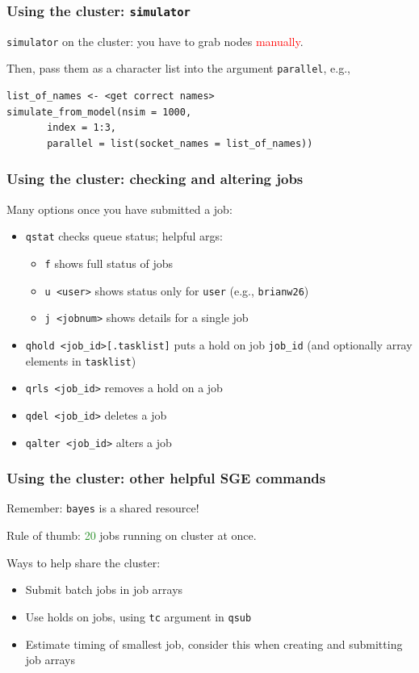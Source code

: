 \documentclass[12pt, 
hyperref={colorlinks=true, linkcolor=BlueViolet, urlcolor=BlueViolet},dvipsnames]{beamer}
\begin{document}
\begin{frame}[fragile]
\frametitle{Using the cluster: \texttt{simulator}}
\texttt{simulator} on the cluster: you have to grab nodes \textcolor{red}{manually}. \pause

Then, pass them as a character list into the argument \texttt{parallel}, e.g., \pause
\begin{verbatim}
list_of_names <- <get correct names>
simulate_from_model(nsim = 1000, 
       index = 1:3, 
       parallel = list(socket_names = list_of_names))
\end{verbatim} 

\end{frame}

\begin{frame}
\frametitle{Using the cluster: checking and altering jobs}

Many options once you have submitted a job: \vspace{-0.3cm} \pause
\begin{itemize}
\item \texttt{qstat} checks queue status; \vspace{-0.1cm} \pause helpful args:
\begin{itemize}
\item \texttt{f} shows full status of jobs
\item \texttt{u <user>} shows status only for \texttt{user} (e.g., \texttt{brianw26})
\item \texttt{j <jobnum>} shows details for a single job 
\end{itemize} \pause
\item \texttt{qhold <job\_id>[.tasklist]} puts a hold on job \texttt{job\_id} (and optionally array elements in \texttt{tasklist}) \pause
\item \texttt{qrls <job\_id>} removes a hold on a job
\item \texttt{qdel <job\_id>} deletes a job
\item \texttt{qalter <job\_id>} alters a job 
\end{itemize}
\end{frame}

\begin{frame}
\frametitle{Using the cluster: other helpful SGE commands}

Remember: \texttt{bayes} is a shared resource! \pause

Rule of thumb: \textcolor{ForestGreen}{20} jobs running on cluster at once. \pause

Ways to help share the cluster: \vspace{-0.3cm} \pause
\begin{itemize}
\item Submit batch jobs in job arrays \pause
\item Use holds on jobs, using \texttt{tc} argument in \texttt{qsub} \pause
\item Estimate timing of smallest job, consider this when creating and submitting job arrays
\end{itemize}
\end{frame}
\end{document}
